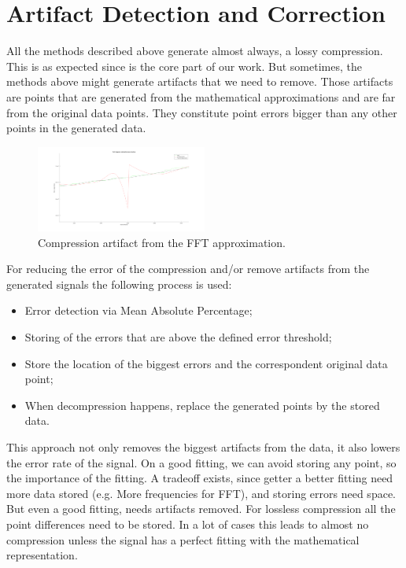 \documentclass[conference]{IEEEtran}
\begin{document}
\vspace{10pt}
\section{Artifact Detection and Correction}

All the methods described above generate almost always, a lossy compression. 
This is as expected since is the core part of our work. 
But sometimes, the methods above might generate artifacts that we need to remove. 
Those artifacts are points that are generated from the mathematical approximations and are far from the original data points.
They constitute point errors bigger than any other points in the generated data.

\begin{figure}[ht]
  \centering
  \includegraphics[width=0.5\textwidth]{compression_artifact.png}
  \caption{Compression artifact from the FFT approximation.}
  \label{Fig.4}
\end{figure}
\vspace{5pt}

For reducing the error of the compression and/or remove artifacts from the generated signals the following process is used:

\begin{itemize}
    \item Error detection via Mean Absolute Percentage;
    \item Storing of the errors that are above the defined error threshold;
    \item Store the location of the biggest errors and the correspondent original data point;
    \item When decompression happens, replace the generated points by the stored data.
\end{itemize}

This approach not only removes the biggest artifacts from the data, it also lowers the error rate of the signal. On a good fitting, we can avoid storing any point, so the importance of the fitting.
A tradeoff exists, since getter a better fitting need more data stored (e.g. More frequencies for FFT), and storing errors need space. But even a good fitting, needs artifacts removed.
For lossless compression all the point differences need to be stored.
In a lot of cases this leads to almost no compression unless the signal has a perfect fitting with the mathematical representation.
\end{document}
